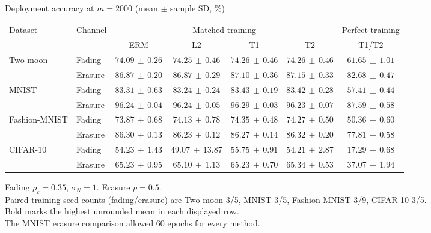 \documentclass[border=4pt]{standalone}
\begin{document}
\begin{minipage}{7.8in}
\centering
Deployment accuracy at $m=2000$ (mean $\pm$ sample SD, \%)\\[4pt]
\begin{tabular*}{\linewidth}{@{\extracolsep{\fill}}llccccc@{}}
\toprule
\multirow{2}{*}{Dataset} & \multirow{2}{*}{Channel} & \multicolumn{4}{c}{Matched training} & Perfect training \\
\cmidrule(lr){3-6}\cmidrule(l){7-7}
 & & ERM & L2 & T1 & T2 & T1/T2 \\
\midrule
\multirow{2}{*}{Two-moon} & Fading & $74.09\,\pm\,0.26$ & $74.25\,\pm\,0.46$ & $74.26\,\pm\,0.46$ & $\mathbf{74.26}\,\pm\,0.46$ & $61.65\,\pm\,1.01$ \\
 & Erasure & $86.87\,\pm\,0.20$ & $86.87\,\pm\,0.29$ & $87.10\,\pm\,0.36$ & $\mathbf{87.15}\,\pm\,0.33$ & $82.68\,\pm\,0.47$ \\
\midrule[0.25pt]
\multirow{2}{*}{MNIST} & Fading & $83.31\,\pm\,0.63$ & $83.24\,\pm\,0.24$ & $\mathbf{83.43}\,\pm\,0.19$ & $83.42\,\pm\,0.28$ & $57.41\,\pm\,0.44$ \\
 & Erasure & $96.24\,\pm\,0.04$ & $96.24\,\pm\,0.05$ & $\mathbf{96.29}\,\pm\,0.03$ & $96.23\,\pm\,0.07$ & $87.59\,\pm\,0.58$ \\
\midrule[0.25pt]
\multirow{2}{*}{Fashion-MNIST} & Fading & $73.87\,\pm\,0.68$ & $74.13\,\pm\,0.78$ & $\mathbf{74.35}\,\pm\,0.48$ & $74.27\,\pm\,0.50$ & $50.36\,\pm\,0.60$ \\
 & Erasure & $86.30\,\pm\,0.13$ & $86.23\,\pm\,0.12$ & $86.27\,\pm\,0.14$ & $\mathbf{86.32}\,\pm\,0.20$ & $77.81\,\pm\,0.58$ \\
\midrule[0.25pt]
\multirow{2}{*}{CIFAR-10} & Fading & $54.23\,\pm\,1.43$ & $49.07\,\pm\,13.87$ & $\mathbf{55.75}\,\pm\,0.91$ & $54.21\,\pm\,2.87$ & $17.29\,\pm\,0.68$ \\
 & Erasure & $65.23\,\pm\,0.95$ & $65.10\,\pm\,1.13$ & $65.23\,\pm\,0.70$ & $\mathbf{65.34}\,\pm\,0.53$ & $37.07\,\pm\,1.94$ \\
\bottomrule
\end{tabular*}
\par\smallskip\raggedright\footnotesize
Fading $\rho_c=0.35$, $\sigma_N=1$. Erasure $p=0.5$.\\
Paired training-seed counts (fading/erasure) are Two-moon 3/5, MNIST 3/5, Fashion-MNIST 3/9, CIFAR-10 3/5.\\
Bold marks the highest unrounded mean in each displayed row.\\
The MNIST erasure comparison allowed 60 epochs for every method.
\end{minipage}
\end{document}
